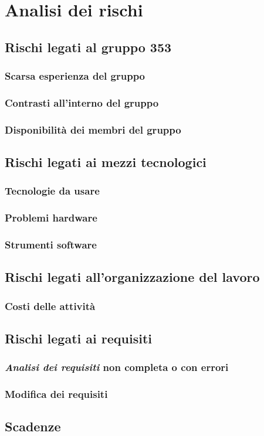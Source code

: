 \documentclass[PianoDiProgetto.tex]{subfiles}
\begin{document}
\chapter{Analisi dei rischi}

\section{Rischi legati al gruppo 353}
\subsection{Scarsa esperienza del gruppo}
\subsection{Contrasti all'interno del gruppo}
\subsection{Disponibilità dei membri del gruppo}


\section{Rischi legati ai mezzi tecnologici}
\subsection{Tecnologie da usare}
\subsection{Problemi hardware}
\subsection{Strumenti software}

\section{Rischi legati all'organizzazione del lavoro}
\subsection{Costi delle attività}

\section{Rischi legati ai requisiti}
\subsection{\textit{Analisi dei requisiti} non completa o con errori}
\subsection{Modifica dei requisiti}

\section{Scadenze}
\end{document}
